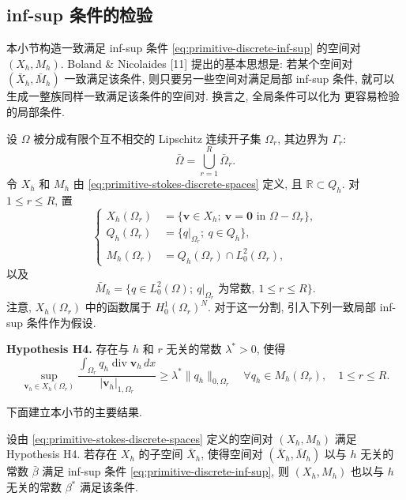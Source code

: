 \subsection{inf-sup 条件的检验}\label{subsec:primitive-discrete-inf-sup-methods}

本小节构造一致满足 inf-sup 条件
\eqref{eq:primitive-discrete-inf-sup} 的空间对 $(X_h,M_h)$.
Boland \& Nicolaides [11] 提出的基本思想是: 若某个空间对
$(\bar X_h,\bar M_h)$ 一致满足该条件, 则只要另一些空间对满足局部 inf-sup 条件,
就可以生成一整族同样一致满足该条件的空间对. 换言之, 全局条件可以化为
更容易检验的局部条件.

设 $\Omega$ 被分成有限个互不相交的 Lipschitz 连续开子集
$\Omega_r$, 其边界为 $\Gamma_r$:
\[
\bar\Omega=\bigcup_{r=1}^R\bar\Omega_r.
\]
令 $X_h$ 和 $M_h$ 由 \eqref{eq:primitive-stokes-discrete-spaces} 定义,
且 $\mathbb R\subset Q_h$. 对 $1\leq r\leq R$, 置
\begin{equation}\label{eq:primitive-local-spaces}
\left\{
\begin{aligned}
X_h(\Omega_r)&=\{\mathbf v\in X_h;\ \mathbf v=\mathbf0
\text{ in }\Omega-\Omega_r\},\\
Q_h(\Omega_r)&=\{q|_{\Omega_r};\ q\in Q_h\},\\
M_h(\Omega_r)&=Q_h(\Omega_r)\cap L_0^2(\Omega_r),
\end{aligned}
\right.
\end{equation}
以及
\begin{equation}\label{eq:primitive-piecewise-constant-pressure-space}
\bar M_h=\{q\in L_0^2(\Omega);\ q|_{\Omega_r}\text{ 为常数},
\ 1\leq r\leq R\}.
\end{equation}
注意, $X_h(\Omega_r)$ 中的函数属于 $H_0^1(\Omega_r)^N$.
对于这一分割, 引入下列一致局部 inf-sup 条件作为假设.

\noindent\textbf{Hypothesis H4.}\quad
存在与 $h$ 和 $r$ 无关的常数 $\lambda^*>0$, 使得
\begin{equation}\label{eq:primitive-local-inf-sup}
\sup_{\mathbf v_h\in X_h(\Omega_r)}
\frac{\displaystyle\int_{\Omega_r}q_h\operatorname{div}\mathbf v_h\,dx}
{|\mathbf v_h|_{1,\Omega_r}}
\geq\lambda^*\|q_h\|_{0,\Omega_r}
\quad\forall q_h\in M_h(\Omega_r),\quad1\leq r\leq R.
\end{equation}

下面建立本小节的主要结果.

\setcounter{statement}{11}
\begin{Theorem}\label{thm:primitive-local-to-global-inf-sup}
设由 \eqref{eq:primitive-stokes-discrete-spaces} 定义的空间对 $(X_h,M_h)$
满足 Hypothesis H4. 若存在 $X_h$ 的子空间 $\bar X_h$, 使得空间对
$(\bar X_h,\bar M_h)$ 以与 $h$ 无关的常数 $\bar\beta$ 满足 inf-sup 条件
\eqref{eq:primitive-discrete-inf-sup}, 则 $(X_h,M_h)$ 也以与 $h$ 无关的常数
$\beta^*$ 满足该条件.
\end{Theorem}

